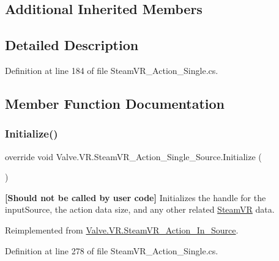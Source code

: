 \subsection*{Additional Inherited Members}


\subsection{Detailed Description}


Definition at line 184 of file Steam\+V\+R\+\_\+\+Action\+\_\+\+Single.\+cs.



\subsection{Member Function Documentation}
\mbox{\label{class_valve_1_1_v_r_1_1_steam_v_r___action___single___source_a4f9479769ac075b66ff50f2840db44c2}} 
\subsubsection{\texorpdfstring{Initialize()}{Initialize()}}
{\footnotesize\ttfamily override void Valve.\+V\+R.\+Steam\+V\+R\+\_\+\+Action\+\_\+\+Single\+\_\+\+Source.\+Initialize (\begin{DoxyParamCaption}{ }\end{DoxyParamCaption})\hspace{0.3cm}{\ttfamily [virtual]}}



{\bfseries{\mbox{[}Should not be called by user code\mbox{]}}} Initializes the handle for the input\+Source, the action data size, and any other related \mbox{\hyperlink{class_valve_1_1_v_r_1_1_steam_v_r}{Steam\+VR}} data. 



Reimplemented from \mbox{\hyperlink{class_valve_1_1_v_r_1_1_steam_v_r___action___in___source_a15f00851d0666c0f9f1836bf481f4f70}{Valve.\+V\+R.\+Steam\+V\+R\+\_\+\+Action\+\_\+\+In\+\_\+\+Source}}.



Definition at line 278 of file Steam\+V\+R\+\_\+\+Action\+\_\+\+Single.\+cs.

